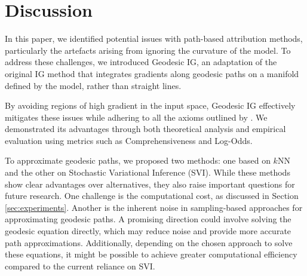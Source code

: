 \section{Discussion} \label{sec:discussion}

In this paper, we identified potential issues with path-based attribution methods, particularly the artefacts arising from ignoring the curvature of the model. To address these challenges, we introduced Geodesic IG, an adaptation of the original IG method that integrates gradients along geodesic paths on a manifold defined by the model, rather than straight lines.

By avoiding regions of high gradient in the input space, Geodesic IG effectively mitigates these issues while adhering to all the axioms outlined by \citet{sundararajan2017axiomatic}. We demonstrated its advantages through both theoretical analysis and empirical evaluation using metrics such as Comprehensiveness and Log-Odds.

To approximate geodesic paths, we proposed two methods: one based on $k$NN and the other on Stochastic Variational Inference (SVI). While these methods show clear advantages over alternatives, they also raise important questions for future research. One challenge is the computational cost, as discussed in Section \ref{sec:experiments}. Another is the inherent noise in sampling-based approaches for approximating geodesic paths. A promising direction could involve solving the geodesic equation directly, which may reduce noise and provide more accurate path approximations. Additionally, depending on the chosen approach to solve these equations, it might be possible to achieve greater computational efficiency compared to the current reliance on SVI.